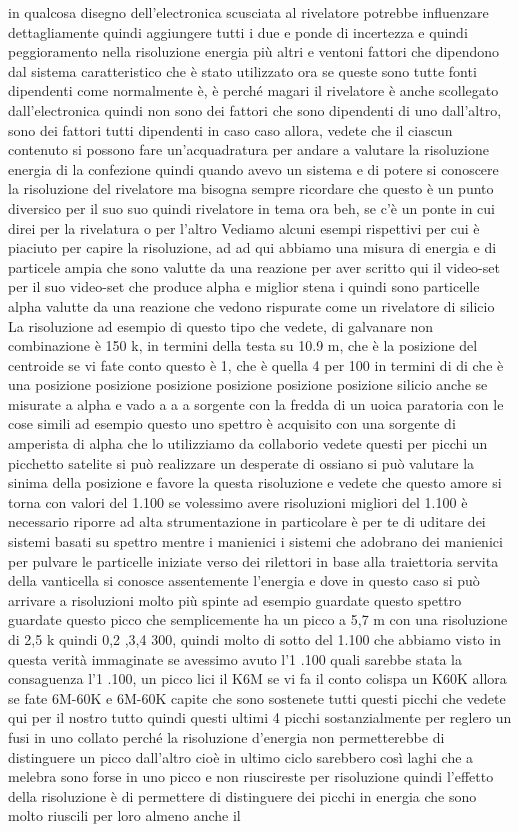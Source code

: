 in qualcosa disegno dell'electronica scusciata al rivelatore potrebbe influenzare dettagliamente quindi aggiungere tutti i due e ponde di incertezza e quindi peggioramento nella risoluzione energia più altri e ventoni fattori che dipendono dal sistema caratteristico che è stato utilizzato ora se queste sono tutte fonti dipendenti come normalmente è, è perché magari il rivelatore è anche scollegato dall'electronica quindi non sono dei fattori che sono dipendenti di uno dall'altro, sono dei fattori tutti dipendenti in caso caso allora, vedete che il ciascun contenuto si possono fare un'acquadratura per andare a valutare la risoluzione energia di la confezione quindi quando avevo un sistema e di potere si conoscere la risoluzione del rivelatore ma bisogna sempre ricordare che questo è un punto diversico per il suo suo quindi rivelatore in tema ora beh, se c'è un ponte in cui direi per la rivelatura o per l'altro Vediamo alcuni esempi rispettivi per cui è piaciuto per capire la risoluzione, ad ad qui abbiamo una misura di energia e di particele ampia che sono valutte da una reazione per aver scritto qui il video-set per il suo video-set che produce alpha e miglior stena i quindi sono particelle alpha valutte da una reazione che vedono rispurate come un rivelatore di silicio La risoluzione ad esempio di questo tipo che vedete, di galvanare non combinazione è 150 k, in termini della testa su 10.9 m, che è la posizione del centroide se vi fate conto questo è 1, che è quella 4 per 100 in termini di di che è una posizione posizione posizione posizione posizione posizione silicio anche se misurate a alpha e vado a a a sorgente con la fredda di un uoica paratoria con le cose simili ad esempio questo uno spettro è acquisito con una sorgente di amperista di alpha che lo utilizziamo da collaborio vedete questi per picchi un picchetto satelite si può realizzare un desperate di ossiano si può valutare la sinima della posizione e favore la questa risoluzione e vedete che questo amore si torna con valori del 1.100 se volessimo avere risoluzioni migliori del 1.100 è necessario riporre ad alta strumentazione in particolare è per te di uditare dei sistemi basati su spettro mentre i manienici i sistemi che adobrano dei manienici per pulvare le particelle iniziate verso dei rilettori in base alla traiettoria servita della vanticella si conosce assentemente l'energia e dove in questo caso si può arrivare a risoluzioni molto più spinte ad esempio guardate questo spettro guardate questo picco che semplicemente ha un picco a 5,7 m con una risoluzione di 2,5 k quindi 0,2 ,3,4 300, quindi molto di sotto del 1.100 che abbiamo visto in questa verità immaginate se avessimo avuto l'1 .100 quali sarebbe stata la consaguenza l'1 .100, un picco lici il K6M se vi fa il conto colispa un K60K allora se fate 6M-60K e 6M-60K capite che sono sostenete tutti questi picchi che vedete qui per il nostro tutto quindi questi ultimi 4 picchi sostanzialmente per reglero un fusi in uno collato perché la risoluzione d'energia non permetterebbe di distinguere un picco dall'altro cioè in ultimo ciclo sarebbero così laghi che a melebra sono forse in uno picco e non riuscireste per risoluzione quindi l'effetto della risoluzione è di permettere di distinguere dei picchi in energia che sono molto riuscili per loro almeno anche il 